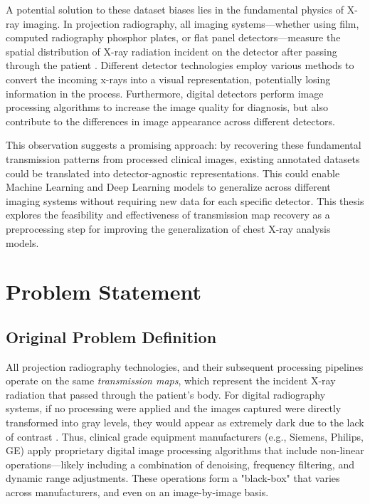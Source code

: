 \documentclass[nomenclature, english, bibtex]{kththesis}
\numberwithin{listing}{chapter}
\begin{document}
A potential solution to these dataset biases lies in the fundamental physics of X-ray imaging.
In projection radiography, all imaging systems—whether using film, computed radiography phosphor plates, or flat panel
detectors—measure the spatial distribution of X-ray radiation incident on the detector after passing through
the patient \cite{Seibert3}. Different detector technologies employ various methods to convert the incoming x-rays
into a visual representation, potentially losing information in the process. Furthermore, digital
detectors perform image processing algorithms to increase the image quality for diagnosis, but also contribute to the
differences in image appearance across different detectors.

This observation suggests a promising approach: by recovering these fundamental transmission patterns from
processed clinical images, existing annotated datasets could be translated into detector-agnostic representations.
This could enable Machine Learning and Deep Learning models to generalize across different imaging systems without
requiring new data for each specific detector. This thesis explores the feasibility and effectiveness of transmission
map recovery as a preprocessing step for improving the generalization of chest X-ray analysis models.

\section{Problem Statement}
\subsection{Original Problem Definition}

All projection radiography technologies, and their subsequent processing pipelines operate on the same
\textit{transmission maps}, which represent the incident X-ray radiation that passed through the patient's body.
For digital radiography systems, if no processing were applied and the images captured were directly transformed
into gray levels, they would appear as extremely dark due to the lack of contrast \cite[p.~1]{Prokop2003}.
Thus, clinical grade equipment manufacturers (e.g., Siemens, Philips, GE) apply proprietary digital image processing
algorithms that include non-linear operations—likely including a combination of denoising, frequency filtering,
and dynamic range adjustments. These operations form a "black-box" that varies across manufacturers, and even on an
image-by-image basis.
\end{document}
